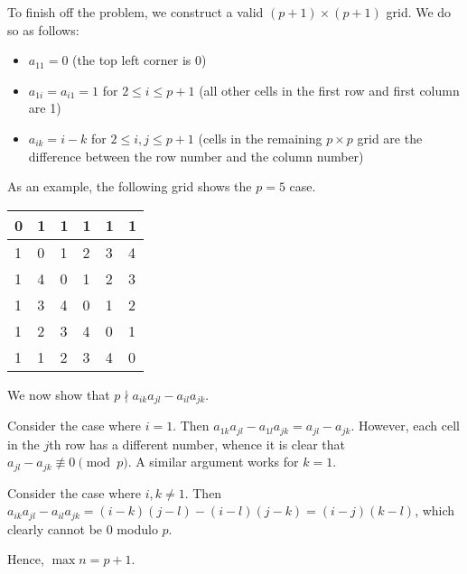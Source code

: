 To finish off the problem, we construct a valid $(p + 1) \times (p + 1)$ grid. We do so as follows:
\begin{itemize}
    \item $a_{11} = 0$ (the top left corner is 0)
    \item $a_{1i} = a_{i1} = 1$ for $2 \leq i \leq p+1$ (all other cells in the first row and first column are 1)
    \item $a_{ik} = i-k$ for $2 \leq i, j \leq p + 1$ (cells in the remaining $p \times p$ grid are the difference between the row number and the column number)
\end{itemize}
As an example, the following grid shows the $p = 5$ case.
\begin{table}[h]
    \centering
    \begin{tabular}{|l|l|l|l|l|l|}
    \hline
    0 & 1 & 1 & 1 & 1 & 1 \\ \hline
    1 & 0 & 1 & 2 & 3 & 4 \\ \hline
    1 & 4 & 0 & 1 & 2 & 3 \\ \hline
    1 & 3 & 4 & 0 & 1 & 2 \\ \hline
    1 & 2 & 3 & 4 & 0 & 1 \\ \hline
    1 & 1 & 2 & 3 & 4 & 0 \\ \hline
    \end{tabular}
\end{table}

We now show that $p \nmid a_{ik}a_{jl} - a_{il}a_{jk}$.

 Consider the case where $i = 1$. Then $a_{1k}a_{jl} - a_{1l}a_{jk} = a_{jl} - a_{jk}$. However, each cell in the $j$th row has a different number, whence it is clear that $a_{jl} - a_{jk} \not\equiv 0 \pmod{p}$. A similar argument works for $k=1$.

 Consider the case where $i, k \neq 1$. Then $a_{ik}a_{jl} - a_{il}a_{jk} = (i-k)(j-l) - (i-l)(j-k) = (i-j)(k-l)$, which clearly cannot be 0 modulo $p$.

Hence, $\max n = p + 1$.
